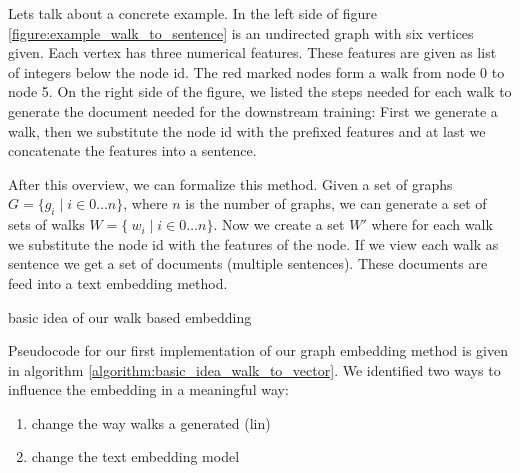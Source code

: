 Lets talk about a concrete example. In the left side of figure \ref{figure:example_walk_to_sentence} is an undirected graph with six vertices given. Each vertex has three numerical features. These features are given as list of integers below the node id. The red marked nodes form a walk from node 0 to node 5. On the right side of the figure, we listed the steps needed for each walk to generate the document needed for the downstream training: First we generate a walk, then we substitute the node id with the prefixed features and at last we concatenate the features into a sentence.

After this overview, we can formalize this method. Given a set of graphs $G = \{g_i \mid i \in 0 \dots n \}$, where $n$ is the number of graphs, we can generate a set of sets of walks $W = \{\ w_i \mid i \in 0 \dots n  \}$. Now we create a set $W'$ where for each walk we substitute the node id with the features of the node. If we view each walk as sentence we get a set of documents (multiple sentences). These documents are feed into a text embedding method.

\begin{minipage}{\linewidth}
    \begin{algorithm}[H]
        \DontPrintSemicolon



        \caption{basic idea of our walk based embedding}
        \label{algorithm:basic_idea_walk_to_vector}
    \end{algorithm}
\end{minipage}

Pseudocode for our first implementation of our graph embedding method is given in algorithm \ref{algorithm:basic_idea_walk_to_vector}. We identified two ways to influence the embedding in a meaningful way:
\begin{enumerate}
    \item 
    change the way walks a generated (lin)

    \item
    change the text embedding model
\end{enumerate}

